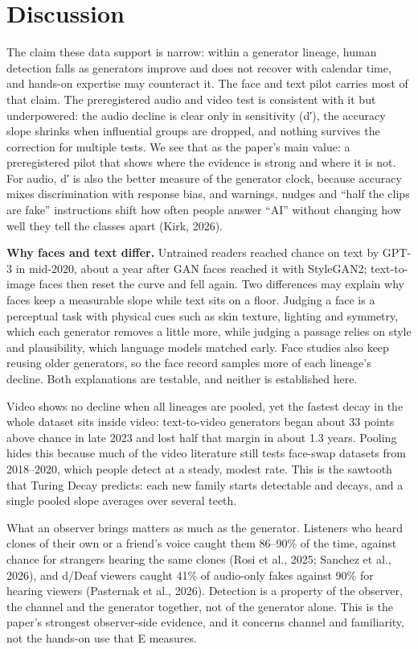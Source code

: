 \documentclass[11pt]{article}
\begin{document}
\hypertarget{discussion}{%
\section{Discussion}\label{discussion}}

The claim these data support is narrow: within a generator lineage,
human detection falls as generators improve and does not recover with
calendar time, and hands-on expertise may counteract it. The face and
text pilot carries most of that claim. The preregistered audio and video
test is consistent with it but underpowered: the audio decline is clear
only in sensitivity (d′), the accuracy slope shrinks when influential
groups are dropped, and nothing survives the correction for multiple
tests. We see that as the paper's main value: a preregistered pilot that
shows where the evidence is strong and where it is not. For audio, d′ is
also the better measure of the generator clock, because accuracy mixes
discrimination with response bias, and warnings, nudges and ``half the
clips are fake'' instructions shift how often people answer ``AI''
without changing how well they tell the classes apart (Kirk, 2026).

\textbf{Why faces and text differ.} Untrained readers reached chance on
text by GPT-3 in mid-2020, about a year after GAN faces reached it with
StyleGAN2; text-to-image faces then reset the curve and fell again. Two
differences may explain why faces keep a measurable slope while text
sits on a floor. Judging a face is a perceptual task with physical cues
such as skin texture, lighting and symmetry, which each generator
removes a little more, while judging a passage relies on style and
plausibility, which language models matched early. Face studies also
keep reusing older generators, so the face record samples more of each
lineage's decline. Both explanations are testable, and neither is
established here.

Video shows no decline when all lineages are pooled, yet the fastest
decay in the whole dataset sits inside video: text-to-video generators
began about 33 points above chance in late 2023 and lost half that
margin in about 1.3 years. Pooling hides this because much of the video
literature still tests face-swap datasets from 2018--2020, which people
detect at a steady, modest rate. This is the sawtooth that Turing Decay
predicts: each new family starts detectable and decays, and a single
pooled slope averages over several teeth.

What an observer brings matters as much as the generator. Listeners who
heard clones of their own or a friend's voice caught them 86--90\% of
the time, against chance for strangers hearing the same clones (Rosi et
al., 2025; Sanchez et al., 2026), and d/Deaf viewers caught 41\% of
audio-only fakes against 90\% for hearing viewers (Pasternak et al.,
2026). Detection is a property of the observer, the channel and the
generator together, not of the generator alone. This is the paper's
strongest observer-side evidence, and it concerns channel and
familiarity, not the hands-on use that E measures.
\end{document}
